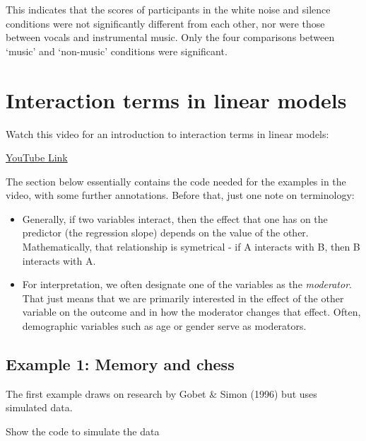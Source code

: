 \documentclass[
]{book}
\providecommand{\tightlist}{%
  \setlength{\itemsep}{0pt}\setlength{\parskip}{0pt}}
\begin{document}
This indicates that the scores of participants in the white noise and silence conditions were not significantly different from each other, nor were those between vocals and instrumental music. Only the four comparisons between `music' and `non-music' conditions were significant.

\hypertarget{interaction-terms-in-linear-models}{%
\chapter{Interaction terms in linear models}\label{interaction-terms-in-linear-models}}

Watch this video for an introduction to interaction terms in linear models:

\textcolor{blue}{\href{https://www.youtube.com/embed/coyXicRccSg?rel=0&modestbranding=1&loop=1&playlist=sk7TT5qM5Hw}{YouTube Link}}

The section below essentially contains the code needed for the examples in the video, with some further annotations. Before that, just one note on terminology:

\begin{itemize}
\tightlist
\item
  Generally, if two variables interact, then the effect that one has on the predictor (the regression slope) depends on the value of the other. Mathematically, that relationship is symetrical - if A interacts with B, then B interacts with A.
\item
  For interpretation, we often designate one of the variables as the \emph{moderator}. That just means that we are primarily interested in the effect of the other variable on the outcome and in how the moderator changes that effect. Often, demographic variables such as age or gender serve as moderators.
\end{itemize}

\hypertarget{example-1-memory-and-chess}{%
\section{Example 1: Memory and chess}\label{example-1-memory-and-chess}}

The first example draws on research by Gobet \& Simon (1996) but uses simulated data.

Show the code to simulate the data
\end{document}
